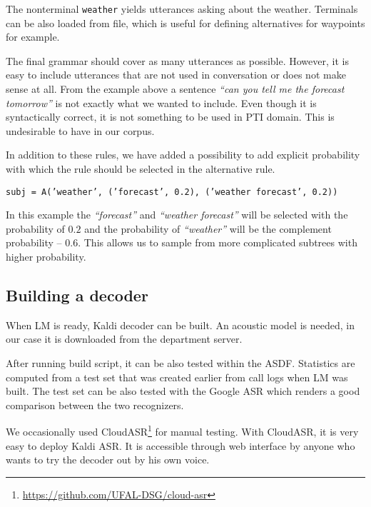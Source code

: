 The nonterminal \texttt{weather} yields utterances asking about the weather.
Terminals can be also loaded from file, which is useful for defining alternatives for waypoints for example.

The final grammar should cover as many utterances as possible.
However, it is easy to include utterances that are not used in conversation or does not make sense at all.
From the example above a sentence \textit{``can you tell me the forecast tomorrow''} is not exactly what we wanted to include.
Even though it is syntactically correct, it is not something to be used in \ac{PTI} domain.
This is undesirable to have in our corpus.

In addition to these rules, we have added a possibility to add explicit probability with which the rule should be selected in the alternative rule.

\begin{flushleft}
\texttt{subj = A('weather', ('forecast', 0.2), ('weather forecast', 0.2))}
\end{flushleft}

\noindent In this example the \textit{``forecast''} and \textit{``weather forecast''} will be selected with the probability of $0.2$ and the probability of \textit{``weather''} will be the complement probability -- $0.6$.
This allows us to sample from more complicated subtrees with higher probability.

\subsection{Building a decoder}

When \ac{LM} is ready, Kaldi decoder can be built.
An acoustic model is needed, in our case it is downloaded from the department server.

After running build script, it can be also tested within the \ac{ASDF}.
Statistics are computed from a test set that was created earlier from call logs when \ac{LM} was built.
The test set can be also tested with the Google \ac{ASR} which renders a good comparison between the two recognizers.

We occasionally used CloudASR\footnote{\url{https://github.com/UFAL-DSG/cloud-asr}} for manual testing.
With CloudASR, it is very easy to deploy Kaldi \ac{ASR}.
It is accessible through web interface by anyone who wants to try the decoder out by his own voice.
